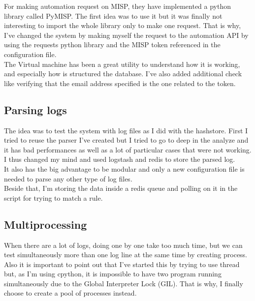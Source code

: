 \documentclass{eplmastersthesis}
\begin{document}
For making automation request on MISP, they have implemented a python library called PyMISP. The first idea was to use it but it was finally not interesting to import the whole library only to make one request. That is why, I've changed the system by making myself the request to the automation API by using the requests python library and the MISP token referenced in the configuration file.\\

The Virtual machine has been a great utility to understand how it is working, and especially how is structured the database. I've also added additional check like verifying that the email address specified is the one related to the token. 

\subsection{Parsing logs}
The idea was to test the system with log files as I did with the hashstore. First I tried to reuse the parser I've created but I tried to go to deep in the analyze and it has bad performances as well as a lot of particular cases that were not working.\\
I thus changed my mind and used logstash and redis to store the parsed log. \\
It also has the big advantage to be modular and only a new configuration file is needed to parse any other type of log files.\\
Beside that, I'm storing the data inside a redis queue and polling on it in the script for trying to match a rule. \\

\subsection{Multiprocessing}
When there are a lot of logs, doing one by one take too much time, but we can test simultaneously more than one log line at the same time by creating process.\\
Also it is important to point out that I've started this by trying to use thread but, as I'm using cpython, it is impossible to have two program running simultaneously due to the Global Interpreter Lock (GIL). That is why, I finally choose to create a pool of processes instead.

\end{document}
